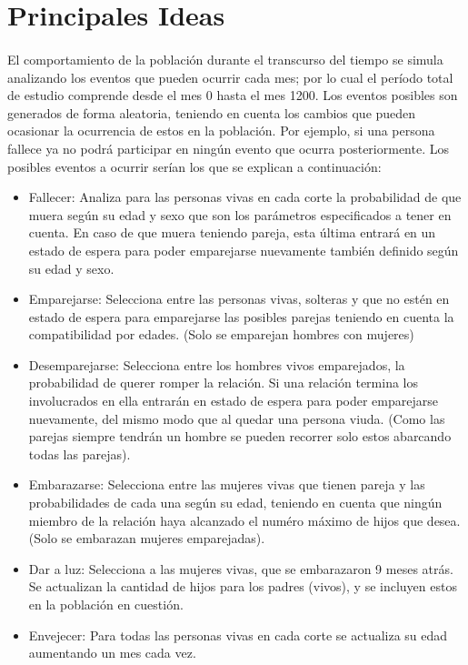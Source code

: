 \documentclass{article}
\begin{document}
    \newpage
    \section{Principales Ideas}
        \paragraph{}
        El comportamiento de la población durante el transcurso del tiempo se simula analizando 
        los eventos que pueden ocurrir cada mes; por lo cual el período total de 
        estudio comprende desde el mes 0 hasta el mes 1200. Los eventos posibles son generados 
        de forma aleatoria, teniendo en cuenta los cambios que pueden ocasionar la ocurrencia de
        estos en la población. 
        Por ejemplo, si una persona fallece ya no podrá participar en ningún evento que ocurra posteriormente.
        Los posibles eventos a ocurrir serían los que se explican a continuación:
        
        \begin{itemize}
            \item Fallecer: Analiza para las personas vivas en cada corte la probabilidad de que muera según su edad y sexo que son los parámetros especificados a tener en cuenta. En caso de que muera teniendo pareja, esta última entrará en un estado de espera para poder emparejarse nuevamente también definido según su edad y sexo.
            \item Emparejarse: Selecciona entre las personas vivas, solteras y que no estén en estado de espera para emparejarse las posibles parejas teniendo en cuenta la compatibilidad por edades. (Solo se emparejan hombres con mujeres)
            \item Desemparejarse: Selecciona entre los hombres vivos emparejados, la probabilidad de querer romper la relación. Si una relación termina los involucrados en ella entrarán en estado de espera para poder emparejarse nuevamente, del mismo modo que al quedar una persona viuda. (Como las parejas siempre tendrán un hombre se pueden recorrer solo estos abarcando todas las parejas).
            \item Embarazarse: Selecciona entre las mujeres vivas que tienen pareja y las probabilidades de cada una según su edad, teniendo en cuenta que ningún miembro de la relación haya alcanzado el numéro máximo de hijos que desea. (Solo se embarazan mujeres emparejadas).
            \item Dar a luz: Selecciona a las mujeres vivas, que se embarazaron 9 meses atrás. Se actualizan la cantidad de hijos para los padres (vivos), y se incluyen estos en la población en cuestión.
            \item Envejecer: Para todas las personas vivas en cada corte se actualiza su edad aumentando un mes cada vez.
        \end{itemize} 
    
\end{document}
